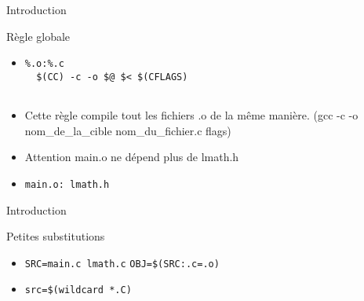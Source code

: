 \def\ftitle{Introduction}
\begin{frame}[containsverbatim]{\ftitle}
\def\blocktitle{Règle globale}
\begin{block}{\blocktitle}
\begin{itemize}
\item \begin{verbatim}
%.o:%.c
  $(CC) -c -o $@ $< $(CFLAGS)
  
\end{verbatim}
\item Cette règle compile tout les fichiers .o de la même manière. (gcc -c -o nom\_de\_la\_cible nom\_du\_fichier.c flags)
\item Attention main.o ne dépend plus de lmath.h
\item \begin{verbatim}
main.o: lmath.h
\end{verbatim}
\end{itemize}

\end{block}
\end{frame}

\begin{frame}[containsverbatim]{\ftitle}
\def\blocktitle{Petites substitutions}
\begin{block}{\blocktitle}
\begin{itemize}
\item \verb!SRC=main.c lmath.c! \verb!OBJ=$(SRC:.c=.o)!
\item \verb!src=$(wildcard *.C)!
\end{itemize}
\end{block}
\end{frame}


